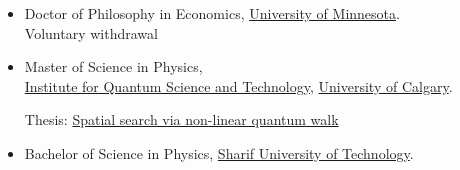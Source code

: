 \documentclass[10pt]{article}
\newenvironment{outerlist}[1][\enskip\textbullet]%
        {\begin{itemize}[#1,leftmargin=*]}{\end{itemize}%
         \vspace{-.6\baselineskip}}
\begin{document}
\begin{outerlist}
\item Doctor of Philosophy in Economics, \href{http://cla.umn.edu/economics}
              {University of Minnesota}.  \\
             Voluntary withdrawal %
%            
%       
%                       
             
\end{outerlist}
\begin{outerlist}
\item Master of Science in Physics, \hspace{2mm} \\ \href{http://www.iqst.ca/}{Institute for Quantum Science and Technology}, \href{http://www.ucalgary.ca/}{University of Calgary}.
           
         Thesis: \href{https://prism.ucalgary.ca/server/api/core/bitstreams/4d5c8717-bab1-4a7d-8caf-32610ab36d2a/content}
             {Spatial search via non-linear quantum walk}\\
       
\end{outerlist}


\begin{outerlist}
\item Bachelor of Science in Physics, 
             \href{http://www.sharif.ir/web/en/}{Sharif University of Technology}.
       
\end{outerlist}
\end{document}
